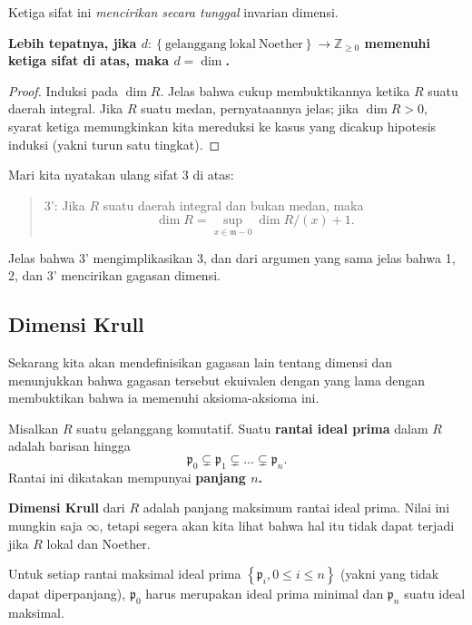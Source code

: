 Ketiga sifat ini \emph{mencirikan secara tunggal} invarian dimensi. 

\textbf{Lebih tepatnya, jika
$d: \left\{\mathrm{gelanggang \ lokal \ Noether}\right\} \to \mathbb{Z}_{\geq 0}$
memenuhi ketiga sifat di atas, maka $d = \dim $. }
\begin{proof} 
Induksi pada $\dim R$. Jelas bahwa cukup membuktikannya ketika $R$ suatu daerah integral. 
Jika $R$ suatu medan, pernyataannya jelas; jika $\dim R>0$, syarat ketiga memungkinkan kita
mereduksi ke kasus yang dicakup hipotesis induksi (yakni turun satu tingkat).
\end{proof} 

Mari kita nyatakan ulang sifat 3 di atas:
\begin{quote}
3': Jika $R$ suatu daerah integral dan bukan medan, maka 
\[ \dim R = \sup_{x \in \mathfrak{m} - 0} \dim R/(x) + 1. \]
\end{quote}
Jelas bahwa 3' mengimplikasikan 3, dan dari argumen yang sama jelas bahwa 1, 2, dan 3'
mencirikan gagasan dimensi.

\subsection{Dimensi Krull} Sekarang kita akan mendefinisikan gagasan lain tentang
dimensi dan menunjukkan bahwa gagasan tersebut ekuivalen dengan yang lama dengan membuktikan bahwa ia
memenuhi aksioma-aksioma ini.

\begin{definition} 
Misalkan $R$ suatu gelanggang komutatif. Suatu \textbf{rantai ideal prima} dalam $R$ adalah barisan
hingga
\[ \mathfrak{p}_0 \subsetneq \mathfrak{p}_1 \subsetneq \dots \subsetneq
\mathfrak{p}_n.  \]
Rantai ini dikatakan mempunyai \textbf{panjang $n$.}
\end{definition} 

\begin{definition} 
\textbf{Dimensi Krull} dari $R$ adalah panjang maksimum rantai
ideal prima. Nilai ini mungkin saja $\infty$, tetapi segera akan kita lihat bahwa hal itu tidak dapat
terjadi jika $R$ lokal dan Noether.
\end{definition} 

\begin{remark} 
Untuk setiap rantai maksimal ideal prima $\left\{\mathfrak{p}_i, 0 \leq i \leq n\right\}$ (yakni yang tidak dapat diperpanjang),
$\mathfrak{p}_0$ harus merupakan ideal prima minimal dan $\mathfrak{p}_n$ suatu ideal maksimal.
\end{remark} 

